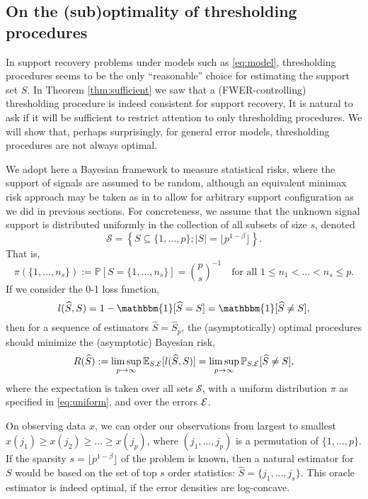 \subsection{On the (sub)optimality of thresholding procedures}
\label{subsec:optimality}

In support recovery problems under models such as \eqref{eq:model}, thresholding procedures seems to be the only ``reasonable'' choice for estimating the support set $S$.
In Theorem \ref{thm:sufficient} we saw that a (FWER-controlling) thresholding procedure is indeed consistent for support recovery, 
It is natural to ask if it will be sufficient to restrict attention to only thresholding procedures.
We will show that, perhaps surprisingly, for general error models, thresholding procedures are not always optimal.

We adopt here a Bayesian framework to measure statistical risks, where the support of signals are assumed to be random, although an equivalent minimax risk approach may be taken as in \cite{butucea2018variable} to allow for arbitrary support configuration as we did in previous sections.
For concreteness, we assume that the unknown signal support is distributed uniformly in the collection of all subsets of size $s$, denoted $$\mathcal{S} = \left\{S\subseteq\{1,\ldots,p\};|S|=\lfloor p^{1-\beta}\rfloor\right\}.$$ 
That is,
\begin{equation} \label{eq:uniform}
\pi(\{1,\ldots, n_s\}) := \mathbb P\left[S = \{1,\ldots, n_s\}\right] = \binom{p}{s}^{-1}\quad
\mbox{for all }1\le n_1<\ldots<n_s\le p.
\end{equation}
If we consider the 0-1 loss function,
$$
l(\widehat{S},S) = 1 - \mathbbm{1}[\widehat{S} = S] = \mathbbm{1}[\widehat{S} \neq S],
$$
then for a sequence of estimators $\widehat{S} = \widehat{S}_p$, the (asymptotically) optimal procedures should minimize the (asymptotic) Bayesian risk,
\begin{equation} \label{eq:Bayesian-risk}
    R(\widehat{S}) := \limsup_{p\to\infty} \mathbb E_{S,{\cal E}} [l(\widehat{S},S)] = \limsup_{p\to\infty} \mathbb P_{S,{\cal E}}[\widehat{S} \neq S],
\end{equation}
where the expectation is taken over all sets $\mathcal{S}$, with a uniform distribution $\pi$ as specified in \eqref{eq:uniform}, and over the errors ${\cal E}$.

On observing data $x$,
we can order our observations from largest to smallest
$x(j_1) \ge x(j_2)  \ge \ldots \ge x(j_p)$,
where $(j_1, \ldots, j_p)$ is a permutation of $\{1, \ldots, p\}$. 
If the sparsity $s = \lfloor p^{1-\beta}\rfloor$ of the problem is known, then a natural estimator for $S$ would be based on the set of top $s$ order statistics: $\widehat{S} = \{j_1, \ldots, j_s\}$.
This oracle estimator is indeed optimal, if the error densities are log-concave.

